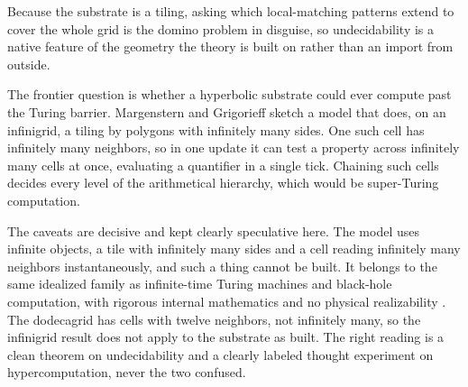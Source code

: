 Because the substrate is a
tiling, asking which local-matching patterns extend to cover the whole grid is the domino problem in
disguise, so undecidability is a native feature of the geometry the theory is built on rather than an
import from outside.

The frontier question is whether a hyperbolic substrate could ever compute past the Turing barrier.
Margenstern and Grigorieff sketch a model that does, on an infinigrid, a tiling by polygons with infinitely
many sides. One such cell has infinitely many neighbors, so in one update it can test a property across
infinitely many cells at once, evaluating a quantifier in a single tick. Chaining such cells decides every
level of the arithmetical hierarchy, which would be super-Turing computation.

The caveats are decisive and
kept clearly speculative here. The model uses infinite objects, a tile with infinitely many sides and a
cell reading infinitely many neighbors instantaneously, and such a thing cannot be built. It belongs to the
same idealized family as infinite-time Turing machines and black-hole computation, with rigorous internal
mathematics and no physical realizability \cite{thooft2014}. The dodecagrid has cells with twelve
neighbors, not infinitely many, so the infinigrid result does not apply to the substrate as built. The
right reading is a clean theorem on undecidability and a clearly labeled thought experiment on
hypercomputation, never the two confused.
